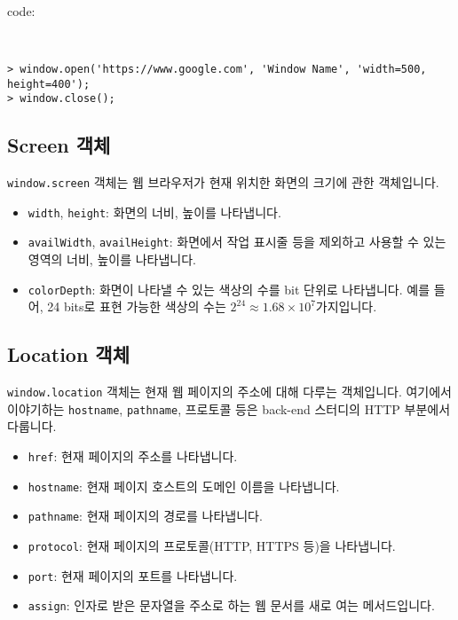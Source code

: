\begin{codeenv}{code:}{}\begin{verbatim}


> window.open('https://www.google.com', 'Window Name', 'width=500, height=400');
> window.close();
\end{verbatim}
\end{codeenv}

\subsection*{Screen 객체}

\texttt{window.screen} 객체는 웹 브라우저가 현재 위치한 화면의 크기에 관한 객체입니다.

\begin{itemize}
    \item \texttt{width}, \texttt{height}: 화면의 너비, 높이를 나타냅니다.
    \item \texttt{availWidth}, \texttt{availHeight}: 화면에서 작업 표시줄 등을 제외하고 사용할 수 있는 영역의 너비, 높이를 나타냅니다.
    \item \texttt{colorDepth}: 화면이 나타낼 수 있는 색상의 수를 bit 단위로 나타냅니다. 예를 들어, 24 bits로 표현 가능한 색상의 수는 $2^{24} \approx 1.68 \times 10^7$가지입니다.
\end{itemize}

\subsection*{Location 객체}

\texttt{window.location} 객체는 현재 웹 페이지의 주소에 대해 다루는 객체입니다. 여기에서 이야기하는 \texttt{hostname}, \texttt{pathname}, 프로토콜 등은 back-end 스터디의 HTTP 부분에서 다룹니다.

\begin{itemize}
    \item \texttt{href}: 현재 페이지의 주소를 나타냅니다.
    \item \texttt{hostname}: 현재 페이지 호스트의 도메인 이름을 나타냅니다.
    \item \texttt{pathname}: 현재 페이지의 경로를 나타냅니다.
    \item \texttt{protocol}: 현재 페이지의 프로토콜(HTTP, HTTPS 등)을 나타냅니다.
    \item \texttt{port}: 현재 페이지의 포트를 나타냅니다.
    \item \texttt{assign}: 인자로 받은 문자열을 주소로 하는 웹 문서를 새로 여는 메서드입니다.
\end{itemize}

